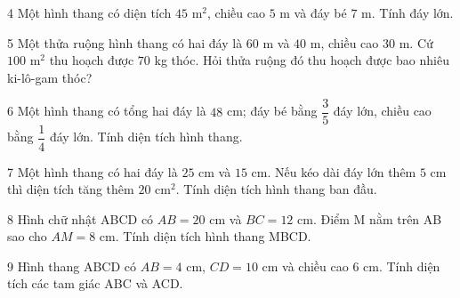 \gap
\begin{probbox}{4}{\relax}
Một hình thang có diện tích $45$ m$^2$, chiều cao $5$ m và đáy bé $7$ m. Tính đáy lớn.
\end{probbox}
\gap
\begin{probbox}{5}{\relax}
Một thửa ruộng hình thang có hai đáy là $60$ m và $40$ m, chiều cao $30$ m. Cứ $100$ m$^2$ thu hoạch được $70$ kg thóc. Hỏi thửa ruộng đó thu hoạch được bao nhiêu ki-lô-gam thóc?
\end{probbox}
\gap
\begin{probbox}{6}{\relax}
Một hình thang có tổng hai đáy là $48$ cm; đáy bé bằng $\dfrac35$ đáy lớn, chiều cao bằng $\dfrac14$ đáy lớn. Tính diện tích hình thang.
\end{probbox}
\gap
\begin{probbox}{7}{\relax}
Một hình thang có hai đáy là $25$ cm và $15$ cm. Nếu kéo dài đáy lớn thêm $5$ cm thì diện tích tăng thêm $20$ cm$^2$. Tính diện tích hình thang ban đầu.
\end{probbox}
\gap
\begin{probbox}{8}{\relax}
Hình chữ nhật ABCD có $AB=20$ cm và $BC=12$ cm. Điểm M nằm trên AB sao cho $AM=8$ cm. Tính diện tích hình thang MBCD.
\end{probbox}
\gap
\begin{probbox}{9}{\relax}
Hình thang ABCD có $AB=4$ cm, $CD=10$ cm và chiều cao $6$ cm. Tính diện tích các tam giác ABC và ACD.
\end{probbox}
